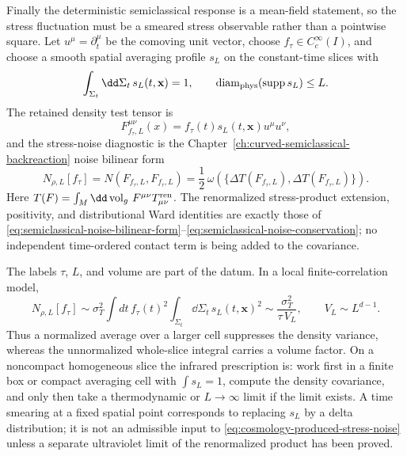 \begin{controlledapproximation}
Finally the deterministic semiclassical response is a mean-field statement, so
the stress fluctuation must be a smeared stress observable rather than a
pointwise square.  Let \(u^\mu=\partial_t^\mu\) be the comoving unit vector,
choose \(f_\tau\in C_c^\infty(I)\), and choose a smooth spatial averaging
profile \(s_L\) on the constant-time slices with
\begin{equation}
  \int_{\Sigma_t}\dd\Sigma_t\,s_L(t,\mathbf x)=1,
  \qquad
  \operatorname{diam}_{\rm phys}(\operatorname{supp}s_L)\le L .
  \label{eq:cosmology-spatial-smearing-normalization}
\end{equation}
The retained density test tensor is
\begin{equation}
  F_{f_\tau,L}^{\mu\nu}(x)
  =
  f_\tau(t)s_L(t,\mathbf x)u^\mu u^\nu ,
  \label{eq:cosmology-stress-noise-test-tensor}
\end{equation}
and the stress-noise diagnostic is the
Chapter~\ref{ch:curved-semiclassical-backreaction} noise bilinear form
\begin{equation}
  N_{\rho,L}[f_\tau]
  =
  N(F_{f_\tau,L},F_{f_\tau,L})
  =
  \frac12\,
  \omega\!\left(
    \{\Delta T(F_{f_\tau,L}),\Delta T(F_{f_\tau,L})\}
  \right).
  \label{eq:cosmology-produced-stress-noise}
\end{equation}
Here \(T(F)=\int_M\dd\operatorname{vol}_g\,F^{\mu\nu}T_{\mu\nu}^{\rm ren}\).
The renormalized stress-product extension, positivity, and distributional Ward
identities are exactly those of
\eqref{eq:semiclassical-noise-bilinear-form}--\eqref{eq:semiclassical-noise-conservation};
no independent time-ordered contact term is being added to the covariance.

The labels \(\tau\), \(L\), and volume are part of the datum.  In a local
finite-correlation model,
\[
  N_{\rho,L}[f_\tau]
  \sim
  \sigma_T^2
  \int dt\, f_\tau(t)^2
  \int_{\Sigma_t}\dd\Sigma_t\,s_L(t,\mathbf x)^2
  \sim
  \frac{\sigma_T^2}{\tau\,V_L},
  \qquad V_L\sim L^{d-1}.
\]
Thus a normalized average over a larger cell suppresses the density variance,
whereas the unnormalized whole-slice integral carries a volume factor.  On a
noncompact homogeneous slice the infrared prescription is: work first in a
finite box or compact averaging cell with \(\int s_L=1\), compute the density
covariance, and only then take a thermodynamic or \(L\to\infty\) limit if the
limit exists.  A time smearing at a fixed spatial point corresponds to replacing
\(s_L\) by a delta distribution; it is not an admissible input to
\eqref{eq:cosmology-produced-stress-noise} unless a separate ultraviolet limit
of the renormalized product has been proved.


\end{controlledapproximation}
